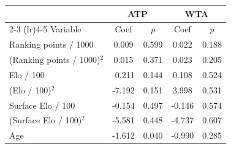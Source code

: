 \begin{tabular}{l cc cc}
\toprule
 & \multicolumn{2}{c}{ATP} & \multicolumn{2}{c}{WTA} \\
\cmidrule(lr){2-3} \cmidrule(lr){4-5}
Variable & Coef & $p$ & Coef & $p$ \\
\midrule
Ranking points / 1000 & 0.009 & 0.599 & 0.022 & 0.188 \\
(Ranking points / 1000)$^2$ & 0.015 & 0.371 & 0.023 & 0.205 \\
Elo / 100 & -0.211 & 0.144 & 0.108 & 0.524 \\
(Elo / 100)$^2$ & -7.192 & 0.151 & 3.998 & 0.531 \\
Surface Elo / 100 & -0.154 & 0.497 & -0.146 & 0.574 \\
(Surface Elo / 100)$^2$ & -5.581 & 0.448 & -4.737 & 0.607 \\
Age & -1.612 & 0.040 & -0.990 & 0.285 \\
\bottomrule
\end{tabular}
